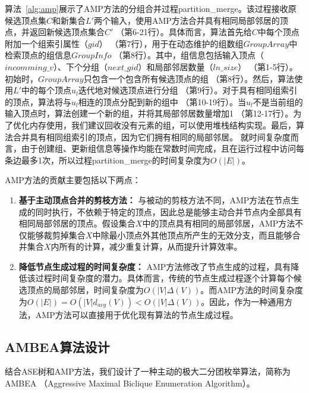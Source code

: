 算法~\ref{alg:amp}展示了AMP方法的分组合并过程\textsf{partition\_merge}。该过程接收原候选顶点集$C$和新集合$L'$两个输入，使用AMP方法合并具有相同局部邻居的顶点，并返回新候选顶点集合$C'$ （第6-21行）。具体而言，算法首先给$C$中每个顶点附加一个组索引属性（$gid$） （第7行），用于在动态维护的组数组$GroupArray$中检索顶点的组信息$GroupInfo$ （第8行）。其中，组信息包括输入顶点（$incomming\_v$）、下个分组（$next\_gid$）和局部邻居数量（$ln\_size$） （第1-5行）。初始时，$GroupArray$只包含一个包含所有候选顶点的组 （第8行）。然后，算法使用$L'$中的每个顶点$u_l$迭代地对候选顶点进行分组 （第9行）。对于具有相同组索引的顶点，算法将与$u_l$相连的顶点分配到新的组中 （第10-19行）。当$u_l$不是当前组的输入顶点时，算法创建一个新的组，并将其局部邻居数量增加1 （第12-17行）。为了优化内存使用，我们建议回收没有元素的组，可以使用堆栈结构实现。最后，算法合并具有相同组索引的顶点，因为它们拥有相同的局部邻居。
就时间复杂度而言，由于创建组、更新组信息等操作均能在常数时间完成，且在运行过程中访问每条边最多1次，所以过程\textsf{partition\_merge}的时间复杂度为$O(|E|)$。

AMP方法的贡献主要包括以下两点：

\begin{enumerate}
  \item \textbf{基于主动顶点合并的剪枝方法：} 与被动的剪枝方法不同，AMP方法在节点生成的同时执行，不依赖于特定的顶点，因此总是能够主动合并节点内全部具有相同局部邻居的顶点。假设集合$X$中的顶点具有相同的局部邻居，AMP方法不仅能够裁剪掉集合$X$中除最小顶点外其他顶点所产生的无效分支，而且能够合并集合$X$内所有的计算，减少重复计算，从而提升计算效率。
  
  \item \textbf{降低节点生成过程的时间复杂度：} AMP方法修改了节点生成的过程，具有降低该过程时间复杂度的潜力。具体而言，传统的节点生成过程逐个计算每个候选顶点的局部邻居，时间复杂度为$O(|V|\Delta(V))$。而AMP方法的时间复杂度为$O(|E|) =O(|V|d_{avg}(V)) < O(|V|\Delta(V))$。因此，作为一种通用方法，AMP方法可以直接用于优化现有算法的节点生成过程。

\end{enumerate}

\subsection{AMBEA算法设计}
\label{subsec:ambea}
  结合ASE树和AMP方法，我们设计了一种主动的极大二分团枚举算法，简称为AMBEA （Aggressive Maximal Biclique Enumeration Algorithm）。

